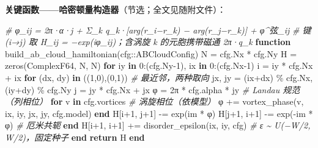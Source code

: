 \documentclass[
]{article}
\newenvironment{Shaded}{}{}
\newcommand{\CommentTok}[1]{\textcolor[rgb]{0.38,0.63,0.69}{\textit{#1}}}
\newcommand{\ConstantTok}[1]{\textcolor[rgb]{0.53,0.00,0.00}{#1}}
\newcommand{\ControlFlowTok}[1]{\textcolor[rgb]{0.00,0.44,0.13}{\textbf{#1}}}
\newcommand{\DataTypeTok}[1]{\textcolor[rgb]{0.56,0.13,0.00}{#1}}
\newcommand{\FloatTok}[1]{\textcolor[rgb]{0.25,0.63,0.44}{#1}}
\newcommand{\FunctionTok}[1]{\textcolor[rgb]{0.02,0.16,0.49}{#1}}
\newcommand{\KeywordTok}[1]{\textcolor[rgb]{0.00,0.44,0.13}{\textbf{#1}}}
\newcommand{\NormalTok}[1]{#1}
\newcommand{\OperatorTok}[1]{\textcolor[rgb]{0.40,0.40,0.40}{#1}}
\begin{document}
\textbf{关键函数------哈密顿量构造器}（节选；全文见随附文件）：

\begin{Shaded}
\begin{Highlighting}[]
\CommentTok{\# φ\_ij = 2π·α·j + Σ\_k q\_k·[arg(r\_i−r\_k) − arg(r\_j−r\_k)] + φ\^{}弦\_ij}
\CommentTok{\# 键 (i→j) 取 H\_ij = −exp(iφ\_ij)；含涡旋 k 的元胞携带磁通 2π·q\_k}
\KeywordTok{function} \FunctionTok{build\_ab\_cloud\_hamiltonian}\NormalTok{(cfg}\OperatorTok{::}\DataTypeTok{ABCloudConfig}\NormalTok{)}
\NormalTok{    N }\OperatorTok{=}\NormalTok{ cfg.Nx }\OperatorTok{*}\NormalTok{ cfg.Ny}
\NormalTok{    H }\OperatorTok{=} \FunctionTok{zeros}\NormalTok{(}\DataTypeTok{ComplexF64}\NormalTok{, N, N)}
    \ControlFlowTok{for}\NormalTok{ iy }\KeywordTok{in} \FloatTok{0}\OperatorTok{:}\NormalTok{(cfg.Ny}\OperatorTok{{-}}\FloatTok{1}\NormalTok{), ix }\KeywordTok{in} \FloatTok{0}\OperatorTok{:}\NormalTok{(cfg.Nx}\OperatorTok{{-}}\FloatTok{1}\NormalTok{)}
\NormalTok{        i }\OperatorTok{=}\NormalTok{ iy }\OperatorTok{*}\NormalTok{ cfg.Nx }\OperatorTok{+}\NormalTok{ ix}
        \ControlFlowTok{for}\NormalTok{ (dx, dy) }\KeywordTok{in}\NormalTok{ ((}\FloatTok{1}\NormalTok{,}\FloatTok{0}\NormalTok{),(}\FloatTok{0}\NormalTok{,}\FloatTok{1}\NormalTok{))            }\CommentTok{\# 最近邻，两种取向}
\NormalTok{            jx, jy }\OperatorTok{=}\NormalTok{ (ix}\OperatorTok{+}\NormalTok{dx) }\OperatorTok{\%}\NormalTok{ cfg.Nx, (iy}\OperatorTok{+}\NormalTok{dy) }\OperatorTok{\%}\NormalTok{ cfg.Ny}
\NormalTok{            j }\OperatorTok{=}\NormalTok{ jy }\OperatorTok{*}\NormalTok{ cfg.Nx }\OperatorTok{+}\NormalTok{ jx}
            \ConstantTok{φ} \OperatorTok{=} \FloatTok{2}\NormalTok{π }\OperatorTok{*}\NormalTok{ cfg.alpha }\OperatorTok{*}\NormalTok{ jy              }\CommentTok{\# Landau 规范（列相位）}
            \ControlFlowTok{for}\NormalTok{ v }\KeywordTok{in}\NormalTok{ cfg.vortices                }\CommentTok{\# 涡旋相位（依模型）}
                \ConstantTok{φ} \OperatorTok{+=} \FunctionTok{vortex\_phase}\NormalTok{(v, ix, iy, jx, jy, cfg.model)}
            \ControlFlowTok{end}
\NormalTok{            H[i}\OperatorTok{+}\FloatTok{1}\NormalTok{, j}\OperatorTok{+}\FloatTok{1}\NormalTok{] }\OperatorTok{{-}=} \FunctionTok{exp}\NormalTok{(}\ConstantTok{im} \OperatorTok{*} \ConstantTok{φ}\NormalTok{)}
\NormalTok{            H[j}\OperatorTok{+}\FloatTok{1}\NormalTok{, i}\OperatorTok{+}\FloatTok{1}\NormalTok{] }\OperatorTok{{-}=} \FunctionTok{exp}\NormalTok{(}\OperatorTok{{-}}\ConstantTok{im} \OperatorTok{*} \ConstantTok{φ}\NormalTok{)          }\CommentTok{\# 厄米共轭}
        \ControlFlowTok{end}
\NormalTok{        H[i}\OperatorTok{+}\FloatTok{1}\NormalTok{, i}\OperatorTok{+}\FloatTok{1}\NormalTok{] }\OperatorTok{+=} \FunctionTok{disorder\_epsilon}\NormalTok{(ix, iy, cfg)   }\CommentTok{\# ε \textasciitilde{} U(−W/2, W/2)，固定种子}
    \ControlFlowTok{end}
    \ControlFlowTok{return}\NormalTok{ H}
\KeywordTok{end}
\end{Highlighting}
\end{Shaded}
\end{document}

